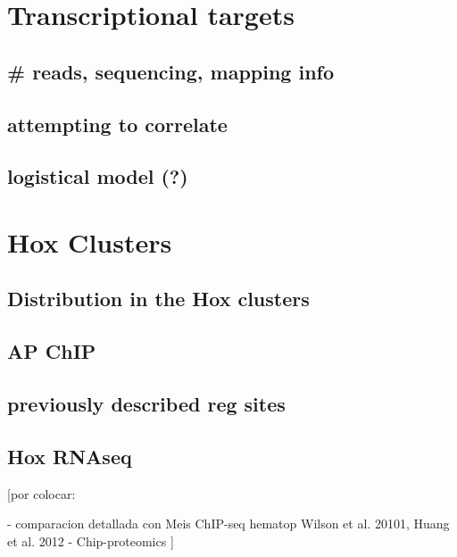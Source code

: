 \section{Transcriptional targets}

\subsection{\# reads, sequencing, mapping info}

\subsection{attempting to correlate}

\subsection{logistical model (?)}

\section{Hox Clusters}

\subsection{Distribution in the Hox clusters}

\subsection{AP ChIP}

\subsection{previously described reg sites}

\subsection{Hox RNAseq}


[por colocar:

- comparacion detallada con Meis ChIP-seq hematop {Wilson et al. 20101, Huang et al. 2012}
- Chip-proteomics
]
